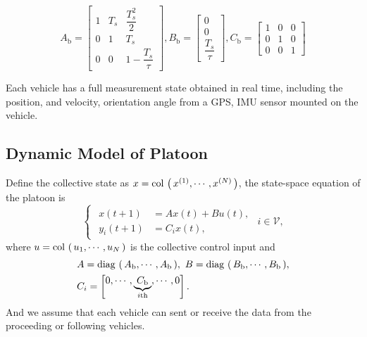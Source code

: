 \documentclass[letterpaper, 10pt, conference]{ieeeconf}  %
\def\col#1{\mathop{{\rm col}\,\left(\,#1\,\right)}}
\def\V{\mathcal{V}} %
\def\diag#1{\mathop{{\rm diag}\,\left(\,#1\,\right)}}
\begin{document}
\begin{equation*}
        A_{\text{b}}  =\begin{bmatrix}
        1 & T_s & \dfrac{T^2_s}{2} \\
        0 & 1 & T_s \\
        0 &  0 & 1 - \dfrac{T_s}{\tau}
          \end{bmatrix},
        B_{\text{b}} =\begin{bmatrix}
        0 \\
        0 \\
        \dfrac{T_s}{\tau}
          \end{bmatrix}, 
  C_{\text{b}}=\begin{bmatrix}
        1 & 0 & 0 \\
        0 & 1 & 0 \\
        0 & 0 & 1
  \end{bmatrix}
\end{equation*}

Each vehicle has a full measurement state obtained in real time, including the  position, and velocity, orientation angle from a GPS, IMU sensor mounted on the vehicle. 




\subsection{Dynamic Model of Platoon}

Define the collective state as $x = \col{x^{(1)}, \cdots , x^{(N)}}$, the state-space equation of the platoon is 
\begin{equation}
    \begin{cases}
        \begin{aligned}
            x(t+1) & = A x(t) + B u(t),\\
            y_{i}(t+1) &= C_{i} x(t),
        \end{aligned}
    \end{cases} i \in \V,
    \label{eq_paltoon}
\end{equation}
where $u = \col{u_{1}, \cdots , u_{N}}$ is the collective control input and
\begin{equation}
    \begin{aligned}
        &A = \diag {A_{\text{b}}, \cdots , A_{\text{b}}}, \ 
        B = \diag {B_{\text{b}}, \cdots , B_{\text{b}}}, \\
        &C_{i} = \begin{bmatrix}
            0, \cdots , \underbrace{C_{\text{b}}}_{i\text{th}}, \cdots , 0
        \end{bmatrix}.
    \end{aligned}
\end{equation}
And we assume that each vehicle can sent or receive the data from the proceeding or following vehicles. 
\end{document}
